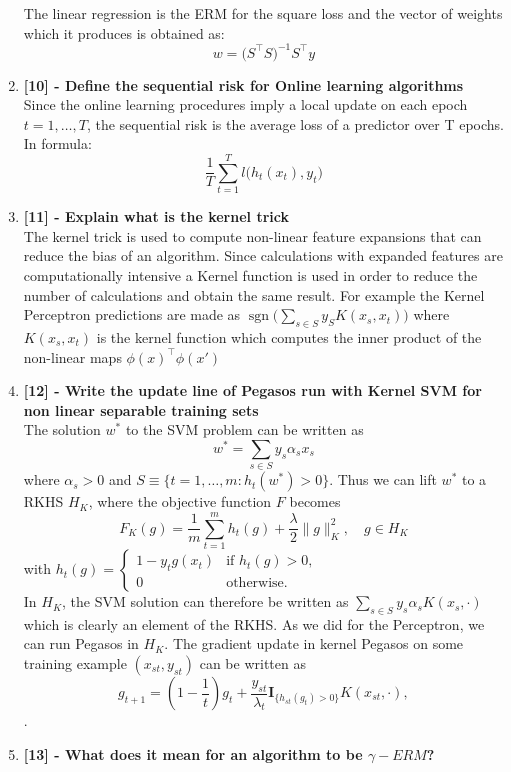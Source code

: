 \documentclass[a4paper]{report}
\begin{document}
\begin{enumerate}
    The linear regression is the ERM for the square loss and the vector of weights which it produces is obtained as: \[w = \big(S^\top S\big)^{-1} S^\top y\]
    \item \textbf{[10] - Define the sequential risk for Online learning algorithms}\\
    Since the online learning procedures imply a local update on each epoch $t = 1, \dots, T$, the sequential risk is the average loss of a predictor over T epochs. In formula:
    \[\frac{1}{T}\sum_{t=1}^{T}l\big(h_t (x_t), y_t\big)\]
    \item \textbf{[11] - Explain what is the kernel trick}\\
    The kernel trick is used to compute non-linear feature expansions that can reduce the bias of an algorithm.
    Since calculations with expanded features are computationally intensive a Kernel function is used in order to reduce the number of calculations and obtain the same result.
    For example the Kernel Perceptron predictions are made as $\operatorname{sgn} \big( \sum_{s \in S} y_S K(x_s, x_t)\big)$ where $K(x_s, x_t)$ is the kernel function which computes the inner product of the non-linear maps $\phi(x)^\top \phi(x')$
    \item \textbf{[12] - Write the update line of Pegasos run with Kernel SVM for non linear separable training sets}\\
The solution $w^*$ to the SVM problem can be written as
\[
w^* = \sum_{s \in S} y_s \alpha_s x_s
\]
where $\alpha_s > 0$ and $S \equiv \{t = 1, \ldots, m : h_t(w^*) > 0\}$. Thus we can lift $w^*$ to a RKHS $H_K$, where the objective function $F$ becomes
\[
F_K(g) = \frac{1}{m} \sum_{t=1}^{m} h_t(g) + \frac{\lambda}{2} \|g\|_K^2, \quad g \in H_K
\]
with $h_t(g) = \begin{cases}
1 - y_t g(x_t) & \text{if } h_t(g) > 0, \\
0 & \text{otherwise}.
\end{cases}$ \\
In $H_K$, the SVM solution can therefore be written as
$\sum_{s \in S} y_s \alpha_s K(x_s, \cdot)$ which is clearly an element of the RKHS.
As we did for the Perceptron, we can run Pegasos in $H_K$. The gradient update in kernel Pegasos on some training example $(x_{st}, y_{st})$ can be written as
\[
g_{t+1} = \left(1 - \frac{1}{t}\right) g_t + \frac{y_{st}}{\lambda_t} \mathbf{I}_{\{h_{st}(g_t) > 0\}} K(x_{st}, \cdot),
\].
    \item \textbf{[13] - What does it mean for an algorithm to be $\gamma-ERM$?}\\

\end{enumerate}
\end{document}
